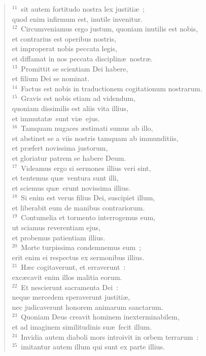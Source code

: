 \begin{flushleft}
\begin{verse}
${}^{11}$~sit autem fortitudo nostra lex justiti\ae~;\\ quod enim infirmum est, inutile invenitur.\\
${}^{12}$~Circumveniamus ergo justum, quoniam inutilis est nobis,\\ et contrarius est operibus nostris,\\ et improperat nobis peccata legis,\\ et diffamat in nos peccata disciplin\ae\ nostr\ae .\\
${}^{13}$~Promittit se scientiam Dei habere,\\ et filium Dei se nominat.\\
${}^{14}$~Factus est nobis in traductionem cogitationum nostrarum.\\
${}^{15}$~Gravis est nobis etiam ad videndum,\\ quoniam dissimilis est aliis vita illius,\\ et immutat\ae\ sunt vi\ae\ ejus.\\
${}^{16}$~Tamquam nugaces \ae stimati sumus ab illo,\\ et abstinet se a viis nostris tamquam ab immunditiis,\\ et pr\ae fert novissima justorum,\\ et gloriatur patrem se habere Deum.\\
${}^{17}$~Videamus ergo si sermones illius veri sint,\\ et tentemus qu\ae\ ventura sunt illi,\\ et sciemus qu\ae\ erunt novissima illius.\\
${}^{18}$~Si enim est verus filius Dei, suscipiet illum,\\ et liberabit eum de manibus contrariorum.\\
${}^{19}$~Contumelia et tormento interrogemus eum,\\ ut sciamus reverentiam ejus,\\ et probemus patientiam illius.\\
${}^{20}$~Morte turpissima condemnemus eum~;\\ erit enim ei respectus ex sermonibus illius.\\
${}^{21}$~H\ae c cogitaverunt, et erraverunt~:\\ exc\ae cavit enim illos malitia eorum.\\
${}^{22}$~Et nescierunt sacramenta Dei~:\\ neque mercedem speraverunt justiti\ae ,\\ nec judicaverunt honorem animarum sanctarum.\\
${}^{23}$~Quoniam Deus creavit hominem inexterminabilem,\\ et ad imaginem similitudinis su\ae\ fecit illum.\\
${}^{24}$~Invidia autem diaboli mors introivit in orbem terrarum~:\\
${}^{25}$~imitantur autem illum qui sunt ex parte illius.\end{verse}\end{flushleft}


